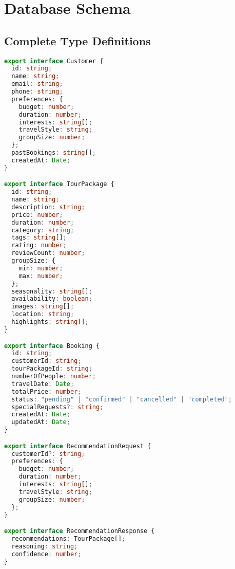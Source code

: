 \documentclass[12pt,a4paper]{article}
\begin{document}
\section{Database Schema}
\subsection{Complete Type Definitions}
\begin{lstlisting}[language=typescript, caption=Complete Type System]
export interface Customer {
  id: string;
  name: string;
  email: string;
  phone: string;
  preferences: {
    budget: number;
    duration: number;
    interests: string[];
    travelStyle: string;
    groupSize: number;
  };
  pastBookings: string[];
  createdAt: Date;
}

export interface TourPackage {
  id: string;
  name: string;
  description: string;
  price: number;
  duration: number;
  category: string;
  tags: string[];
  rating: number;
  reviewCount: number;
  groupSize: {
    min: number;
    max: number;
  };
  seasonality: string[];
  availability: boolean;
  images: string[];
  location: string;
  highlights: string[];
}

export interface Booking {
  id: string;
  customerId: string;
  tourPackageId: string;
  numberOfPeople: number;
  travelDate: Date;
  totalPrice: number;
  status: "pending" | "confirmed" | "cancelled" | "completed";
  specialRequests?: string;
  createdAt: Date;
  updatedAt: Date;
}

export interface RecommendationRequest {
  customerId?: string;
  preferences: {
    budget: number;
    duration: number;
    interests: string[];
    travelStyle: string;
    groupSize: number;
  };
}

export interface RecommendationResponse {
  recommendations: TourPackage[];
  reasoning: string;
  confidence: number;
}
\end{lstlisting}
\end{document}
